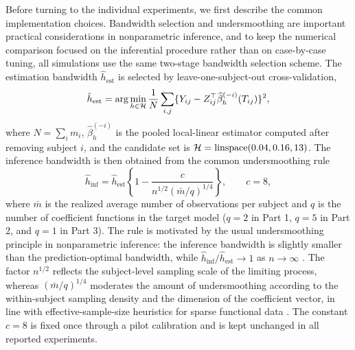 \documentclass[12pt]{article} %
\theoremstyle{definition}
\begin{document}
Before turning to the individual experiments, we first describe the common
implementation choices. Bandwidth selection and undersmoothing are important
practical considerations in nonparametric inference, and to keep the numerical
comparison focused on the inferential procedure rather than on case-by-case
tuning, all simulations use the same two-stage
bandwidth selection scheme. The estimation bandwidth
\(\hat h_{\mathrm{est}}\) is selected by leave-one-subject-out
cross-validation,
\begin{equation}
\label{eq:loso-cv}
\hat h_{\mathrm{est}}
=\arg\min_{h\in{\cal H}}
\frac{1}{N}\sum_{i,j}
\{Y_{ij}-Z_{ij}^{\top}\widehat\beta_{h}^{(-i)}(T_{ij})\}^{2},
\end{equation}
where \(N=\sum_i m_i\), \(\widehat\beta_h^{(-i)}\) is the pooled local-linear
estimator computed after removing subject \(i\), and the candidate set is
\({\cal H}=\mathrm{linspace}(0.04,0.16,13)\). The inference bandwidth is then
obtained from the common undersmoothing rule
\begin{equation}
\label{eq:undersmoothing-rule}
\hat h_{\mathrm{inf}}
=\hat h_{\mathrm{est}}
\left\{1-\frac{c}{n^{1/2}(\bar m/q)^{1/4}}\right\},
\qquad c=8,
\end{equation}
where \(\bar m\) is the realized average number of observations per subject and
\(q\) is the number of coefficient functions in the target model
(\(q=2\) in Part 1, \(q=5\) in Part 2, and \(q=1\) in Part 3). The rule is
motivated by the usual undersmoothing principle in nonparametric inference:
the inference bandwidth is slightly smaller than the prediction-optimal
bandwidth, while \(\hat h_{\mathrm{inf}}/\hat h_{\mathrm{est}}\to1\) as
\(n\to\infty\) \citep{Hall1992,CalonicoCattaneoTitiunik2014,CalonicoCattaneoFarrell2018}.
The factor \(n^{1/2}\) reflects the subject-level sampling
scale of the limiting process, whereas \((\bar m/q)^{1/4}\) moderates the
amount of undersmoothing according to the within-subject sampling density and
the dimension of the coefficient vector, in line with effective-sample-size
heuristics for sparse functional data \citep{YaoMullerWang2005,ZhangWang2016}.
The constant \(c=8\) is fixed once
through a pilot calibration and is kept unchanged in all reported experiments.
\end{document}
